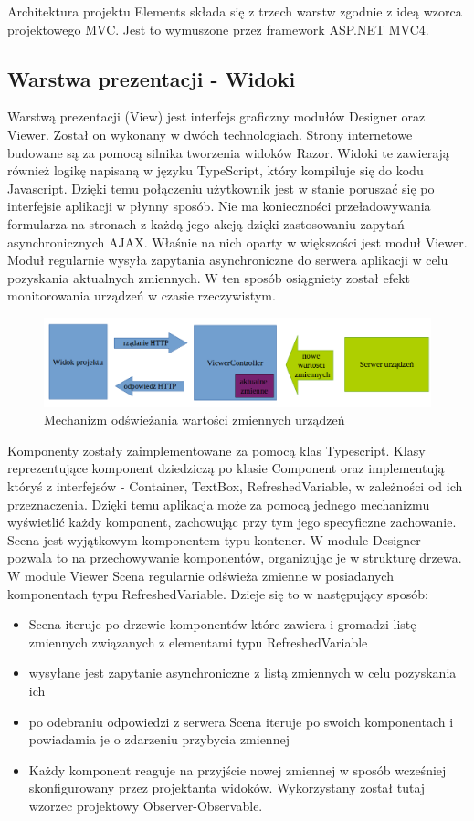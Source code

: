 Architektura projektu Elements składa się z trzech warstw zgodnie z ideą wzorca projektowego MVC. Jest to wymuszone przez framework ASP.NET MVC4. 

\subsection{Warstwa prezentacji - Widoki}
Warstwą prezentacji (View) jest interfejs graficzny modułów Designer oraz Viewer. Został on wykonany w dwóch technologiach. Strony internetowe budowane są za pomocą silnika tworzenia widoków Razor. Widoki te zawierają również logikę napisaną w języku TypeScript, który kompiluje się do kodu Javascript. Dzięki temu połączeniu użytkownik jest w stanie poruszać się po interfejsie aplikacji w płynny sposób. Nie ma konieczności przeładowywania formularza na stronach z każdą jego akcją dzięki zastosowaniu zapytań asynchronicznych AJAX. Właśnie na nich oparty w większości jest moduł Viewer. Moduł regularnie wysyła zapytania asynchroniczne do serwera aplikacji w celu pozyskania aktualnych zmiennych. W ten sposób osiągniety został efekt monitorowania urządzeń w czasie rzeczywistym.

\begin{figure}[h]
	\includegraphics[width=150mm]{./img/viewer.png}
	\caption{Mechanizm odświeżania wartości zmiennych urządzeń}
	\label{fig:viewer}
\end{figure}

Komponenty zostały zaimplementowane za pomocą klas Typescript. Klasy reprezentujące komponent dziedziczą po klasie Component oraz implementują któryś z interfejsów - Container, TextBox, RefreshedVariable, w zależności od ich przeznaczenia. Dzięki temu aplikacja może za pomocą jednego mechanizmu wyświetlić każdy komponent, zachowując przy tym jego specyficzne zachowanie. Scena jest wyjątkowym komponentem typu kontener. W module Designer pozwala to na przechowywanie komponentów, organizując je w strukturę drzewa. W module Viewer Scena regularnie odświeża zmienne w posiadanych komponentach typu RefreshedVariable. Dzieje się to w następujący sposób:
\begin{itemize}
\item Scena iteruje po drzewie komponentów które zawiera i gromadzi listę zmiennych związanych z elementami typu RefreshedVariable
\item wysyłane jest zapytanie asynchroniczne z listą zmiennych w celu pozyskania ich
\item po odebraniu odpowiedzi z serwera Scena iteruje po swoich komponentach i powiadamia je o zdarzeniu przybycia zmiennej
\item Każdy komponent reaguje na przyjście nowej zmiennej w sposób wcześniej skonfigurowany przez projektanta widoków. Wykorzystany został tutaj wzorzec projektowy Observer-Observable.
\end{itemize}

